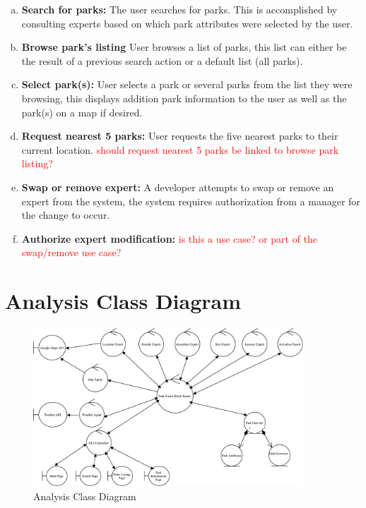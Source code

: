 \documentclass[titlepage,12pt]{article}
\begin{document}
\begin{enumerate}[a)]
    \item \textbf{Search for parks:} The user searches for parks. This is accomplished by consulting
    experts based on which park attributes were selected by the user.
    \item \textbf{Browse park's listing} User browses a list of parks, this list can either be the
    result of a previous search action or a default list (all parks).
    \item \textbf{Select park(s):} User selects a park or several parks from the list they were
    browsing, this displays addition park information to the user as well as the park(s) on a map if
    desired.
    \item \textbf{Request nearest 5 parks:} User requests the five nearest parks to their current
    location. \textcolor{red}{should request nearest 5 parks be linked to browse park listing?}
    \item \textbf{Swap or remove expert:} A developer attempts to swap or remove an expert from the
    system, the system requires authorization from a manager for the change to occur.
    \item \textbf{Authorize expert modification:} \textcolor{red}{is this a use case? or part of the
    swap/remove use case?}
\end{enumerate}


\section{Analysis Class Diagram}
\label{sec:analysis_class_diagram}

\begin{figure}[H]
	\centerline{\includegraphics[width=0.9\textwidth]{images//analysis_class_diagram}}
	\caption{Analysis Class Diagram}
	\label{analysisClassDiagram}
\end{figure}
\end{document}
